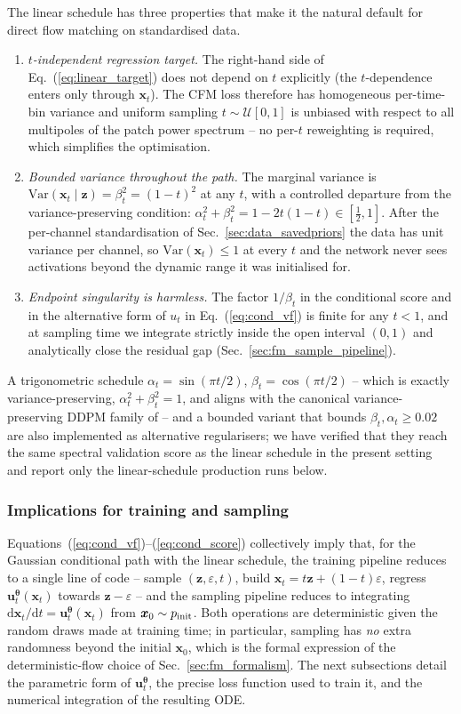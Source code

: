 \documentclass[11pt]{article}
\newcommand{\Var}{\mathrm{Var}}
\newcommand{\e}{\varepsilon}
\newcommand{\dd}{\mathrm{d}}
\DeclareRobustCommand{\uvec}{\bm{u}}
\DeclareRobustCommand{\xvec}{\bm{x}}
\DeclareRobustCommand{\zvec}{\bm{z}}
\DeclareRobustCommand{\thetavec}{\bm{\theta}}
\newcommand{\pinit}{p_{\rm init}}
\theoremstyle{definition}
\begin{document}
The linear schedule has three properties that make it the natural default for direct flow matching on standardised data.
\begin{enumerate}[leftmargin=2.0em,itemsep=0.15em]
  \item \emph{$t$-independent regression target.} The right-hand side of Eq.~(\ref{eq:linear_target}) does not depend on $t$ explicitly (the $t$-dependence enters only through $\xvec_t$). The CFM loss therefore has homogeneous per-time-bin variance and uniform sampling $t\sim\mathcal U[0,1]$ is unbiased with respect to all multipoles of the patch power spectrum -- no per-$t$ reweighting is required, which simplifies the optimisation.
  \item \emph{Bounded variance throughout the path.} The marginal variance is $\Var(\xvec_t\mid\zvec)=\beta_t^2=(1-t)^2$ at any $t$, with a controlled departure from the variance-preserving condition: $\alpha_t^2+\beta_t^2=1-2t(1-t)\in[\tfrac12,1]$. After the per-channel standardisation of Sec.~\ref{sec:data_savedpriors} the data has unit variance per channel, so $\Var(\xvec_t)\leq 1$ at every $t$ and the network never sees activations beyond the dynamic range it was initialised for.
  \item \emph{Endpoint singularity is harmless.} The factor $1/\beta_t$ in the conditional score and in the alternative form of $u_t$ in Eq.~(\ref{eq:cond_vf}) is finite for any $t<1$, and at sampling time we integrate strictly inside the open interval $(0,1)$ and analytically close the residual gap (Sec.~\ref{sec:fm_sample_pipeline}).
\end{enumerate}
A trigonometric schedule $\alpha_t=\sin(\pi t/2)$, $\beta_t=\cos(\pi t/2)$ -- which is exactly variance-preserving, $\alpha_t^2+\beta_t^2=1$, and aligns with the canonical variance-preserving DDPM family of \cite{ho2020ddpm,song2021sde} -- and a bounded variant that bounds $\beta_t,\alpha_t\geq 0.02$ are also implemented as alternative regularisers; we have verified that they reach the same spectral validation score as the linear schedule in the present setting and report only the linear-schedule production runs below.

\subsubsection{Implications for training and sampling}

Equations~(\ref{eq:cond_vf})--(\ref{eq:cond_score}) collectively imply that, for the Gaussian conditional path with the linear schedule, the training pipeline reduces to a single line of code -- sample $(\zvec,\e,t)$, build $\xvec_t=t\zvec+(1-t)\e$, regress $\uvec_t^{\thetavec}(\xvec_t)$ towards $\zvec-\e$ -- and the sampling pipeline reduces to integrating $\dd\xvec_t/\dd t = \uvec_t^{\thetavec}(\xvec_t)$ from $\xvec_0\sim\pinit$. Both operations are deterministic given the random draws made at training time; in particular, sampling has \emph{no} extra randomness beyond the initial $\xvec_0$, which is the formal expression of the deterministic-flow choice of Sec.~\ref{sec:fm_formalism}. The next subsections detail the parametric form of $\uvec_t^{\thetavec}$, the precise loss function used to train it, and the numerical integration of the resulting ODE.
\end{document}
